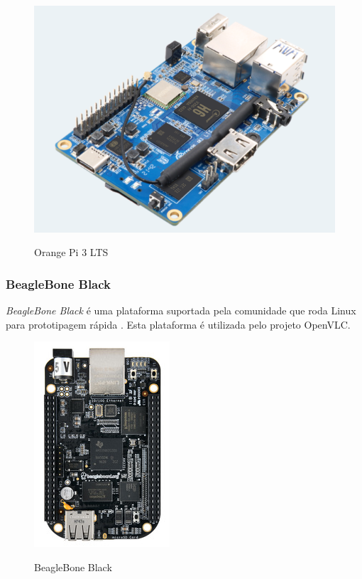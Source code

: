 \begin{figure}[!htbp]
  \caption{Orange Pi 3 LTS}
  \includegraphics[scale=0.35]{images/orange.png}
  \label{figura:orange}
\end{figure}

\newpage

\subsubsection{BeagleBone Black}

\textit{BeagleBone Black} é uma plataforma suportada pela comunidade que roda Linux para prototipagem rápida \cite{beaglebone}.
Esta plataforma é utilizada pelo projeto OpenVLC. \newline

\begin{figure}[!htbp]
  \caption{BeagleBone Black}
  \includegraphics[scale=0.58]{images/beaglebone.png}
  \label{figura:beagle}
\end{figure}

